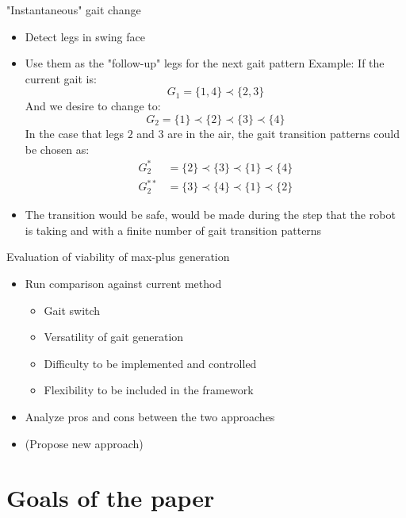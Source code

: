 \documentclass{beamer}
\begin{document}
\begin{frame}{"Instantaneous" gait change}
	\begin{itemize}\setlength\itemsep{1.5em}
		\item Detect legs in swing face
		\item Use them as the "follow-up" legs for the next gait pattern
		Example:
		If the current gait is:
		\begin{equation*}
		G_1 = \{1,4\}\prec \{2,3\}
		\end{equation*} 
		And we desire to change to:
		\begin{equation*}
		G_2 = \{1\} \prec \{2\} \prec \{3\} \prec \{4\} 
		\end{equation*}
		In the case that legs $2$ and $3$ are in the air, the gait transition patterns could be chosen as:
		\begin{align*}
		G_2^* &=  \{2\} \prec \{3\} \prec \{1\} \prec \{4\} \\
		G_2^{**} &= \{3\} \prec \{4\} \prec \{1\} \prec \{2\}
		\end{align*}
		\item The transition would be safe, would be made during the step that the robot is taking and with a finite number of gait transition patterns
	\end{itemize}
\end{frame}

\begin{frame}{Evaluation of viability of max-plus generation}
\begin{itemize}\setlength\itemsep{3em}
\item Run comparison against current method
\begin{itemize}
\item Gait switch
\item Versatility of gait generation
\item Difficulty to be implemented and controlled
\item Flexibility to be included in the framework
\end{itemize}
\item Analyze pros and cons between the two approaches
\item (Propose new approach)
\end{itemize}
\end{frame}


\section{Goals of the paper}
\end{document}
